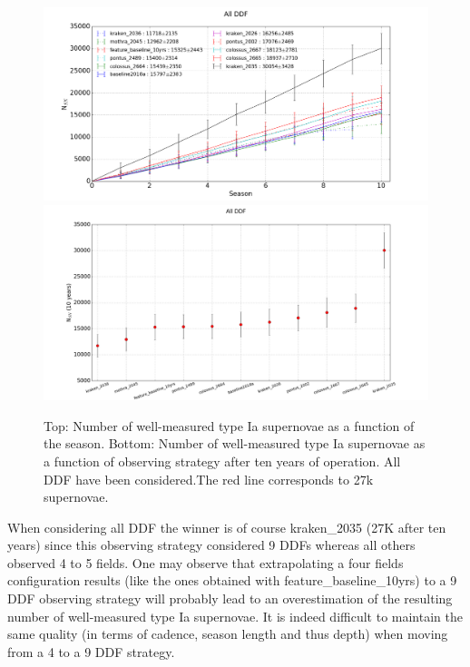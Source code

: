 \documentclass [11pt,a4paper]{article}
\newcommand{\feature}{feature\_baseline\_10yrs}
\begin{document}
\begin{figure}[htbp]
\begin{center}
  
  \includegraphics[width=15cm]{Figures/NSN_season_allDDF.png}
  \includegraphics[width=15cm]{Figures/NSN_all_allDDF.png}
 \caption{Top: Number of well-measured type Ia supernovae as a function of the season. Bottom: Number of  well-measured type Ia supernovae as a function of observing strategy after ten years of operation. All DDF have been considered.The red line corresponds to 27k supernovae.}\label{fig:nsn_all}
\end{center}
\end{figure}

When considering all DDF the winner is of course kraken\_2035 (27K after ten years) since this observing strategy considered 9 DDFs whereas all others observed 4 to 5 fields. One may observe that extrapolating a four fields configuration results (like the ones obtained with \feature) to a 9 DDF observing strategy will probably lead to an overestimation of the resulting number of well-measured type Ia supernovae. It is indeed difficult to maintain the same quality (in terms of cadence, season length and thus depth) when moving from a 4 to a 9 DDF strategy.
\end{document}
